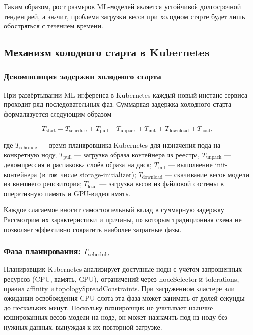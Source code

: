 Таким образом, рост размеров ML-моделей является устойчивой долгосрочной тенденцией, а значит, проблема загрузки весов при холодном старте будет лишь обостряться с течением времени.

\subsection{Механизм холодного старта в Kubernetes}

\subsubsection{Декомпозиция задержки холодного старта}

При развёртывании ML-инференса в Kubernetes каждый новый инстанс сервиса проходит ряд последовательных фаз. Суммарная задержка холодного старта формализуется следующим образом:

\begin{equation}
T_{\mathrm{start}} = T_{\mathrm{schedule}} + T_{\mathrm{pull}} + T_{\mathrm{unpack}} + T_{\mathrm{init}} + T_{\mathrm{download}} + T_{\mathrm{load}},
\label{eq:cold_start}
\end{equation}

где $T_{\mathrm{schedule}}$ --- время планировщика Kubernetes для назначения пода на конкретную ноду; $T_{\mathrm{pull}}$ --- загрузка образа контейнера из реестра; $T_{\mathrm{unpack}}$ --- декомпрессия и распаковка слоёв образа на диск; $T_{\mathrm{init}}$ --- выполнение init-контейнера (в том числе storage-initializer); $T_{\mathrm{download}}$ --- скачивание весов модели из внешнего репозитория; $T_{\mathrm{load}}$ --- загрузка весов из файловой системы в оперативную память и GPU-видеопамять.

Каждое слагаемое вносит самостоятельный вклад в суммарную задержку. Рассмотрим их характеристики и причины, по которым традиционная схема не позволяет эффективно сократить наиболее затратные фазы.

\subsubsection{Фаза планирования: $T_{\mathrm{schedule}}$}

Планировщик Kubernetes анализирует доступные ноды с учётом запрошенных ресурсов (CPU, память, GPU), ограничений через nodeSelector и tolerations, правил affinity и topologySpreadConstraints. При загруженном кластере или ожидании освобождения GPU-слота эта фаза может занимать от долей секунды до нескольких минут. Поскольку планировщик не учитывает наличие кэшированных весов модели на ноде, он может назначить под на ноду без нужных данных, вынуждая к их повторной загрузке.


